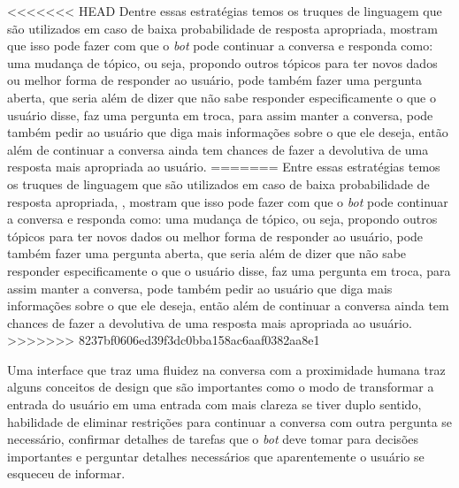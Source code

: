 \documentclass[
	12pt,				%
	oneside,
	a4paper,			%
	english,			%
	french,				%
	spanish,			%
	brazil				%
	]{abntex2}
\begin{document}
<<<<<<< HEAD
Dentre essas estratégias temos os truques de linguagem que são utilizados em caso de baixa probabilidade de resposta apropriada, \textcite{dialogue-manag.} mostram que isso pode fazer com que o \emph{bot} pode continuar a conversa e responda como: uma mudança de tópico, ou seja, propondo outros tópicos para ter novos dados ou melhor forma de responder ao usuário, pode também fazer uma pergunta aberta, que seria além de dizer que não sabe responder especificamente o que o usuário disse, faz uma pergunta em troca, para assim manter a conversa, pode também pedir ao usuário que diga mais informações sobre o que ele deseja, então além de continuar a conversa ainda tem chances de fazer a devolutiva de uma resposta mais apropriada ao usuário.
=======
Entre essas estratégias temos os truques de linguagem que são utilizados em caso de baixa probabilidade de resposta apropriada, \textcite{dialogue-manag.}, mostram que isso pode fazer com que o \emph{bot} pode continuar a conversa e responda como: uma mudança de tópico, ou seja, propondo outros tópicos para ter novos dados ou melhor forma de responder ao usuário, pode também fazer uma pergunta aberta, que seria além de dizer que não sabe responder especificamente o que o usuário disse, faz uma pergunta em troca, para assim manter a conversa, pode também pedir ao usuário que diga mais informações sobre o que ele deseja, então além de continuar a conversa ainda tem chances de fazer a devolutiva de uma resposta mais apropriada ao usuário.
>>>>>>> 8237bf0606ed39f3dc0bba158ac6aaf0382aa8e1

Uma interface que traz uma fluidez na conversa com a proximidade humana traz alguns conceitos de design que são importantes como o modo de transformar a entrada do usuário em uma entrada com mais clareza se tiver duplo sentido, habilidade de eliminar restrições para continuar a conversa com outra pergunta se necessário, confirmar detalhes  de tarefas que o \emph{bot} deve tomar para decisões importantes e perguntar detalhes necessários que aparentemente o usuário se esqueceu de informar.


\end{document}
